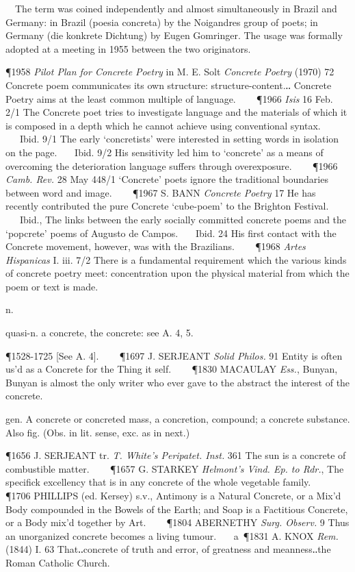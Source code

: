 \begin{description}[wide, labelwidth=!, labelindent=0pt]
\begin{myenumerate}
  The term was coined independently and almost simultaneously in Brazil and Germany: in Brazil (poesia concreta) by the Noigandres group of poets; in Germany (die konkrete Dichtung) by Eugen Gomringer. The usage was formally adopted at a meeting in 1955 between the two originators. 

\P 1958 \textit{Pilot  Plan for Concrete Poetry} in M. E. Solt \textit{Concrete Poetry} (1970) 72 Concrete poem communicates its own structure: structure-content.‥ Concrete Poetry aims at the least common multiple of language.    
\P 1966 \textit{Isis}  16 Feb. 2/1 The Concrete poet tries to investigate language and the materials of which it is composed in a depth which he cannot achieve using conventional syntax.    Ibid. 9/1 The early ‘concretists’ were interested in setting words in isolation on the page.    Ibid. 9/2 His sensitivity led him to ‘concrete’ as a means of overcoming the deterioration language suffers through overexposure.    
\P 1966 \textit{Camb.  Rev.} 28 May 448/1 ‘Concrete’ poets ignore the traditional boundaries between word and image.    
\P 1967 S. BANN  \textit{Concrete Poetry} 17 He has recently contributed the pure Concrete ‘cube-poem’ to the Brighton Festival.    Ibid., The links between the early socially committed concrete poems and the ‘popcrete’ poems of Augusto de Campos.    Ibid. 24 His first contact with the Concrete movement, however, was with the Brazilians.    
\P 1968 \textit{Artes  Hispanicas} I. iii. 7/2 There is a fundamental requirement which the various kinds of concrete poetry meet: concentration upon the physical material from which the poem or text is made.

 n.

 quasi-n. a concrete, the concrete: see A. 4, 5.

\P 1528-1725 [See  A. 4].    
\P 1697 J. SERJEANT  \textit{Solid Philos.} 91 Entity is often us'd as a Concrete for the Thing it self.    
\P 1830 MACAULAY  \textit{Ess.}, Bunyan, Bunyan is almost the only writer who ever gave to the abstract the interest of the concrete.

 gen. A concrete or concreted mass, a concretion, compound; a concrete substance. Also fig. (Obs. in lit. sense, exc. as in next.)

\P 1656 J. SERJEANT tr. \textit{T. White's Peripatet. Inst.} 361 The sun is a concrete of combustible matter.    
\P 1657 G. STARKEY  \textit{Helmont's Vind. Ep. to Rdr.}, The specifick excellency that is in any concrete of the whole vegetable family.    
\P 1706 PHILLIPS  (ed. Kersey) s.v., Antimony is a Natural Concrete, or a Mix'd Body compounded in the Bowels of the Earth; and Soap is a Factitious Concrete, or a Body mix'd together by Art.    
\P 1804 ABERNETHY  \textit{Surg. Observ.} 9 Thus an unorganized concrete becomes a living tumour.    a 
\P 1831 A. KNOX  \textit{Rem.} (1844) I. 63 That‥concrete of truth and error, of greatness and meanness‥the Roman Catholic Church.


\end{myenumerate}
\end{description}
